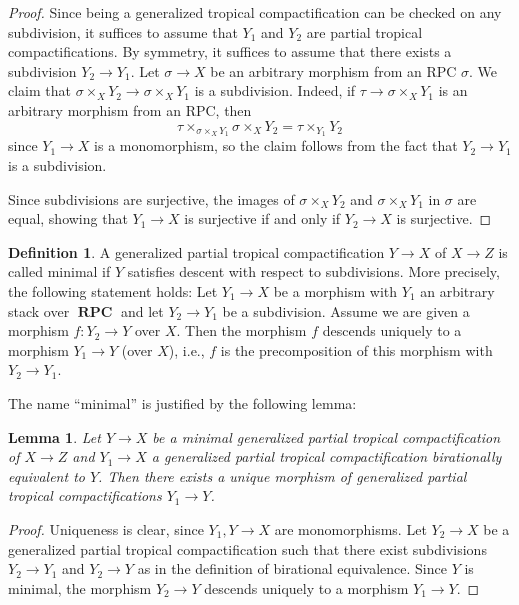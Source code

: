 \documentclass[11pt]{amsart}
\newtheorem{lemma}[theorem]{Lemma}
\theoremstyle{definition}
\newtheorem{definition}[theorem]{Definition}
\theoremstyle{remark}
\DeclareMathOperator{\RPC}{\mathbf{RPC}}
\begin{document}
\begin{proof}
	Since being a generalized tropical compactification can be checked on any subdivision, it suffices to assume that $Y_1$
	and $Y_2$ are partial tropical compactifications.
	By symmetry, it suffices to assume that there exists a subdivision $Y_2\to Y_1$. Let
	$\sigma\to X$ be an arbitrary morphism from an RPC $\sigma$. We claim that $\sigma\times_X Y_2\to \sigma\times_X Y_1$
	is a subdivision. Indeed, if $\tau\to \sigma\times_X Y_1$ is an arbitrary morphism from an RPC, then
	$$\tau\times_{\sigma\times_X Y_1}\sigma\times_X Y_2=\tau\times_{Y_1}Y_2$$
	since $Y_1\to X$ is a monomorphism, so the claim follows from the fact that $Y_2\to Y_1$ is a subdivision.

	Since subdivisions are surjective, the images of $\sigma\times_X Y_2$ and $\sigma\times_X Y_1$ in $\sigma$ are equal,
	showing that $Y_1\to X$ is surjective if and only if $Y_2\to X$ is surjective.
\end{proof}

\begin{definition}
	A generalized partial tropical compactification $Y\to X$ of $X\to Z$ is called minimal if $Y$ satisfies descent
	with respect to subdivisions. More precisely, the following statement holds: Let $Y_1\to X$ be a morphism
	with $Y_1$ an arbitrary stack over $\RPC$ and let $Y_2\to Y_1$ be a subdivision. Assume we are given a morphism $f:Y_2\to Y$ over $X$.
	Then the morphism $f$ descends uniquely to a morphism $Y_1\to Y$ (over $X$), i.e., $f$ is the precomposition of this morphism
	with $Y_2\to Y_1$.
\end{definition}

The name ``minimal'' is justified by the following lemma:

\begin{lemma}
	Let $Y\to X$ be a minimal generalized partial tropical compactification of $X\to Z$ and $Y_1\to X$ a generalized partial tropical compactification
	birationally equivalent to $Y$. Then there exists a unique morphism of generalized partial tropical compactifications $Y_1\to Y$.
\end{lemma}

\begin{proof}
	Uniqueness is clear, since $Y_1,Y\to X$ are monomorphisms.
	Let $Y_2\to X$ be a generalized partial tropical compactification such that there exist subdivisions
	$Y_2\to Y_1$ and $Y_2\to Y$ as in the definition of birational equivalence.
	Since $Y$ is minimal, the morphism $Y_2\to Y$ descends uniquely to a morphism $Y_1\to Y$.
\end{proof}
\end{document}
